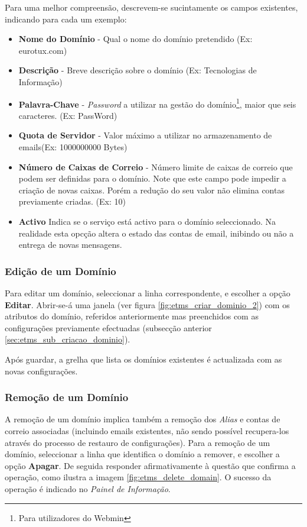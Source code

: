 Para uma melhor compreensão, descrevem-se sucintamente os campos existentes, indicando para cada um exemplo:
\begin{itemize}
\item \textbf{Nome do Domínio} - Qual o nome do domínio pretendido (Ex: eurotux.com)
\item \textbf{Descrição} - Breve descrição sobre o domínio (Ex: Tecnologias de Informação)
\item \textbf{Palavra-Chave} - \textit{Password} a utilizar na gestão do domínio\footnote{Para utilizadores do Webmin}, maior que seis caracteres. (Ex: PassWord)
\item \textbf{Quota de Servidor} - Valor máximo a utilizar no armazenamento de emails(Ex: 1000000000 Bytes)
\item \textbf{Número de Caixas de Correio} - Número limite de caixas de correio que podem ser definidas para o domínio. Note que este campo pode impedir a criação de novas caixas. Porém a redução do seu valor não elimina contas previamente criadas. (Ex: 10)
\item \textbf{Activo} Indica se o serviço está activo para o domínio seleccionado. Na realidade esta opcção altera o estado das contas de email, inibindo ou não a entrega de novas mensagens.
\end{itemize}

\subsubsection{Edição de um Domínio}
\label{sec:etms_sub_edicao_dominio}
Para editar um domínio, seleccionar a linha correspondente, e escolher a opção \textbf{Editar}. Abrir-se-á uma janela (ver figura \ref{fig:etms_criar_dominio_2}) com os atributos do domínio, referidos anteriormente mas preenchidos com as configurações previamente efectuadas (subsecção anterior \ref{sec:etms_sub_criacao_dominio}). 

Após guardar, a grelha que lista os domínios existentes é actualizada com as novas configurações.

\subsubsection{Remoção de um Domínio}
\label{sec:etms_sub_remocao_dominio}
A remoção de um domínio implica também a remoção dos \textit{Alias} e contas de correio associadas (incluindo emails existentes, não sendo possível recupera-los através do processo de restauro de configurações). Para a remoção de um domínio, seleccionar a linha que identifica o domínio a remover, e escolher a opção \textbf{Apagar}. De seguida responder afirmativamente à questão que confirma a operação, como ilustra a imagem \ref{fig:etms_delete_domain}. O sucesso da operação é indicado no \textit{Painel de Informação}.

